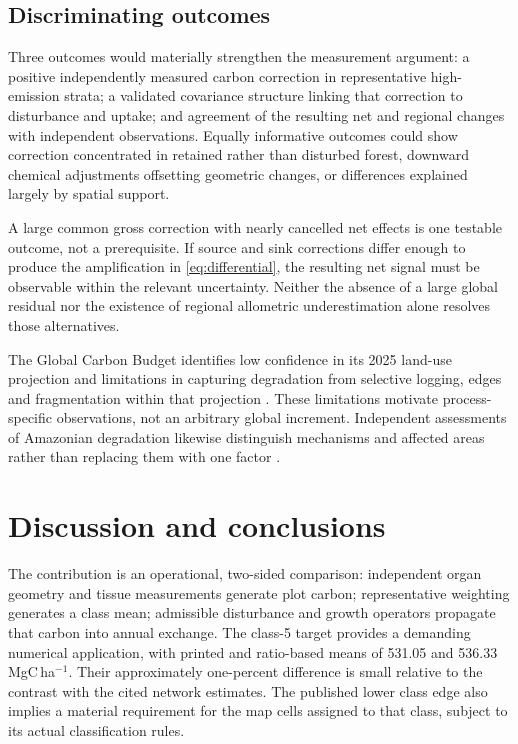\documentclass[11pt,a4paper]{article}
\theoremstyle{remark}
\begin{document}
\subsection{Discriminating outcomes}
Three outcomes would materially strengthen the measurement argument: a positive independently measured carbon correction in representative high-emission strata; a validated covariance structure linking that correction to disturbance and uptake; and agreement of the resulting net and regional changes with independent observations. Equally informative outcomes could show correction concentrated in retained rather than disturbed forest, downward chemical adjustments offsetting geometric changes, or differences explained largely by spatial support.

A large common gross correction with nearly cancelled net effects is one testable outcome, not a prerequisite. If source and sink corrections differ enough to produce the amplification in \eqref{eq:differential}, the resulting net signal must be observable within the relevant uncertainty. Neither the absence of a large global residual nor the existence of regional allometric underestimation alone resolves those alternatives.

The Global Carbon Budget identifies low confidence in its 2025 land-use projection and limitations in capturing degradation from selective logging, edges and fragmentation within that projection \citep{Friedlingstein2026}. These limitations motivate process-specific observations, not an arbitrary global increment. Independent assessments of Amazonian degradation likewise distinguish mechanisms and affected areas rather than replacing them with one factor \citep{Lapola2023}.

\section{Discussion and conclusions}
The contribution is an operational, two-sided comparison: independent organ geometry and tissue measurements generate plot carbon; representative weighting generates a class mean; admissible disturbance and growth operators propagate that carbon into annual exchange. The class-5 target provides a demanding numerical application, with printed and ratio-based means of 531.05 and 536.33\,MgC\,ha$^{-1}$. Their approximately one-percent difference is small relative to the contrast with the cited network estimates. The published lower class edge also implies a material requirement for the map cells assigned to that class, subject to its actual classification rules.
\end{document}
